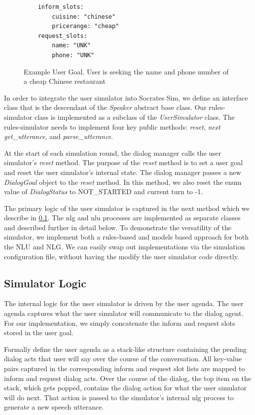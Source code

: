 \begin{figure}[h!]
	\label{fig:ex_user_goal}
	\begin{lstlisting}
	inform_slots:
		cuisine: "chinese"
		pricerange: "cheap"
	request_slots:
		name: "UNK"
		phone: "UNK"		
	\end{lstlisting}
	\caption{ Example User Goal. User is seeking the name and phone number of a cheap Chinese restaurant}
	
\end{figure}

\pagebreak

In order to integrate the user simulator into Socrates Sim, we define an interface class that is the descendant of the \textit{Speaker} abstract base class. Our rules-simulator class is implemented as a subclass of the \textit{UserSimulator} class. The rules-simulator needs to implement four key public methods:  \textit{reset}, \textit{next} \textit{get\_utterance}, and \textit{parse\_utterance}. 

At the start of each simulation round, the dialog manager calls the user simulator's \textit{reset} method. The purpose of the \textit{reset} method is to set a user goal and reset the user simulator's internal state. The dialog manager passes a new \textit{DialogGoal} object to the \textit{reset} method. In this method, we also reset the enum value of \textit{DialogStatus} to NOT\_STARTED and current turn to -1.

The primary logic of the user simulator is captured in the next method which we describe in \ref{sssec:logic}. The nlg and nlu processes are implemented as separate classes and described further in detail below. To demonstrate the versatility of the simulator, we implement both a rules-based and models based approach for both the NLU and NLG. We can easily swap out implementations via the simulation configuration file, without having the modify the user simulator code directly.

\subsection{Simulator Logic}
\label{sssec:logic}

The internal logic for the user simulator is driven by the user agenda. The user agenda captures what the user simulator will communicate to the dialog agent. For our implementation, we simply concatenate the inform and request slots stored in the user goal. 

Formally \cite{Schatzmann2009TheHA} define the user agenda as a stack-like structure containing the pending dialog acts that user will say over the course of the conversation. All key-value pairs captured in the corresponding inform and request slot lists are mapped to inform and request dialog acts. Over the course of the dialog, the top item on the stack, which gets popped, contains the dialog action for what the user simulator will do next. That action is passed to the simulator's internal nlg process to generate a new speech utterance. 

